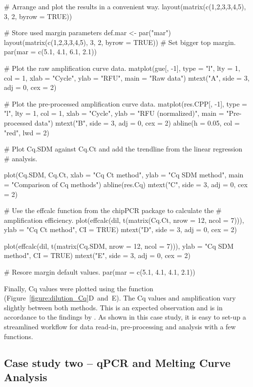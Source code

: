 \begin{example}
# Arrange and plot the results in a convenient way.
layout(matrix(c(1,2,3,3,4,5), 3, 2, byrow = TRUE))

# Store used margin parameters
def.mar <- par("mar")
layout(matrix(c(1,2,3,3,4,5), 3, 2, byrow = TRUE))
# Set bigger top margin.
par(mar = c(5.1, 4.1, 6.1, 2.1))

# Plot the raw amplification curve data.
matplot(gue[, -1], type = "l", lty = 1, col = 1, xlab = "Cycle", 
        ylab = "RFU", main = "Raw data")
mtext("A", side = 3, adj = 0, cex = 2)

# Plot the pre-processed amplification curve data.
matplot(res.CPP[, -1], type = "l", lty = 1, col = 1, xlab = "Cycle", 
        ylab = "RFU (normalized)", main = "Pre-processed data")
mtext("B", side = 3, adj = 0, cex = 2)
abline(h = 0.05, col = "red", lwd = 2)

# Plot Cq.SDM against Cq.Ct and add the trendline from the linear regression
# analysis.

plot(Cq.SDM, Cq.Ct, xlab = "Cq Ct method", ylab = "Cq SDM method", 
     main = "Comparison of Cq methods")
abline(res.Cq)
mtext("C", side = 3, adj = 0, cex = 2)

# Use the effcalc function from the chipPCR package to calculate the
# amplification efficiency.
plot(effcalc(dil, t(matrix(Cq.Ct, nrow = 12, ncol = 7))), ylab = "Cq Ct method", 
     CI = TRUE)
mtext("D", side = 3, adj = 0, cex = 2)

plot(effcalc(dil, t(matrix(Cq.SDM, nrow = 12, ncol = 7))), ylab = "Cq SDM method", 
     CI = TRUE)
mtext("E", side = 3, adj = 0, cex = 2)

# Resore margin default values.
par(mar = c(5.1, 4.1, 4.1, 2.1))
\end{example}

Finally, Cq values were plotted using the  function 
(Figure~\ref{figure:dilution_Cq}D~and~E). The Cq values and amplification vary 
slightly between both methods. This is an expected observation and is in 
accordance to the findings by \citet{ruijter_2013}. As shown in this case study, 
it is easy to set-up a streamlined workflow for data read-in, pre-processing and 
analysis with a few functions.

\subsection{Case study two -- qPCR and Melting Curve Analysis}

